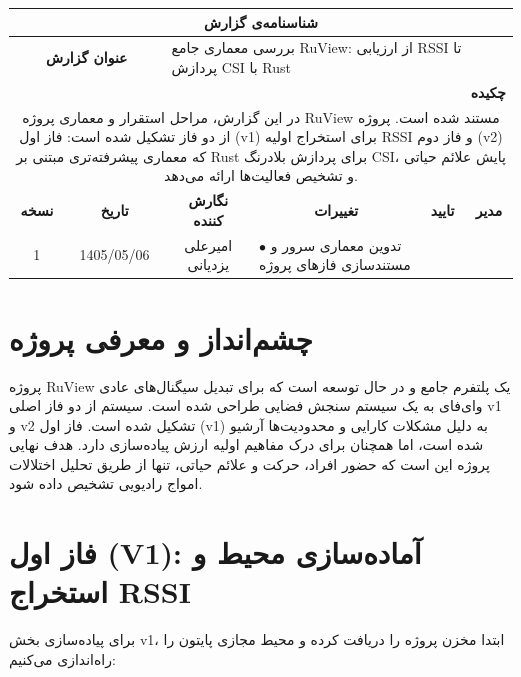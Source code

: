 \documentclass[12pt, a4paper]{article}
\newcommand{\lr}[1]{\foreignlanguage{english}{#1}}
\begin{document}
\thispagestyle{empty}

\begin{center}
\renewcommand{\arraystretch}{1.8}
\begin{tabularx}{\textwidth}{|c|c|c|X|c|c|}
\hline
\multicolumn{6}{|c|}{\textbf{شناسنامه‌ی گزارش}} \\
\hline
\multicolumn{2}{|c|}{\textbf{عنوان گزارش}} & \multicolumn{4}{l|}{بررسی معماری جامع \lr{RuView}: از ارزیابی \lr{RSSI} تا پردازش \lr{CSI} با \lr{Rust}} \\
\hline
\multicolumn{6}{|r|}{\textbf{چکیده}} \\
\hline
\multicolumn{6}{|p{\dimexpr\textwidth-2\tabcolsep-2\arrayrulewidth\relax}|}{
در این گزارش، مراحل استقرار و معماری پروژه \lr{RuView} مستند شده است. پروژه از دو فاز تشکیل شده است: فاز اول (\lr{v1}) برای استخراج اولیه \lr{RSSI} و فاز دوم (\lr{v2}) که معماری پیشرفته‌تری مبتنی بر \lr{Rust} برای پردازش بلادرنگ \lr{CSI}، پایش علائم حیاتی و تشخیص فعالیت‌ها ارائه می‌دهد.
} \\
\hline
\textbf{نسخه} & \textbf{تاریخ} & \textbf{نگارش کننده} & \multicolumn{1}{c|}{\textbf{تغییرات}} & \textbf{تایید} & \textbf{مدیر} \\
\hline
1 & 1405/05/06 & امیرعلی یزدیانی & $\bullet$ تدوین معماری سرور و مستندسازی فازهای پروژه & & \\
\hline
\end{tabularx}
\end{center}

\vspace{1cm}
\tableofcontents
\newpage

\section{چشم‌انداز و معرفی پروژه}
پروژه \lr{RuView} یک پلتفرم جامع و در حال توسعه است که برای تبدیل سیگنال‌های عادی وای‌فای به یک سیستم سنجش فضایی طراحی شده است. سیستم از دو فاز اصلی \lr{v1} و \lr{v2} تشکیل شده است. فاز اول (\lr{v1}) به دلیل مشکلات کارایی و محدودیت‌ها آرشیو شده است، اما همچنان برای درک مفاهیم اولیه ارزش پیاده‌سازی دارد. هدف نهایی پروژه این است که حضور افراد، حرکت و علائم حیاتی، تنها از طریق تحلیل اختلالات امواج رادیویی تشخیص داده شود.

\section{فاز اول (\lr{V1}): آماده‌سازی محیط و استخراج \lr{RSSI}}
برای پیاده‌سازی بخش \lr{v1}، ابتدا مخزن پروژه را دریافت کرده و محیط مجازی پایتون را راه‌اندازی می‌کنیم:
\end{document}
